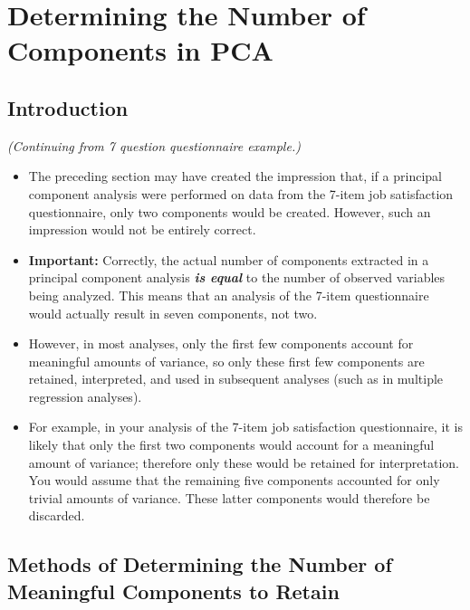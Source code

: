 \documentclass[a4paper,12pt]{article}
\begin{document}
\section{Determining the Number of Components in PCA }
\subsection{Introduction}
\textit{(Continuing from 7 question questionnaire example.)}
\begin{itemize}
	\item The preceding section may have created the impression
	that, if a principal component analysis were performed on data from the 7-item job satisfaction
	questionnaire, only two components would be created.  However, such an impression would not
	be entirely correct.
	
	\item \textbf{Important:} Correctly, the actual number of components extracted in a principal component analysis \textbf{\emph{is equal}} to the
	number of observed variables being analyzed.  This means that an analysis of the 7-item
	questionnaire would actually result in seven components, not two.
	
	\item 	However, in most analyses, only the first few components account for meaningful amounts of
	variance, so only these first few components are retained, interpreted, and used in subsequent
	analyses (such as in multiple regression analyses).  \item For example, in your analysis of the 7-item
	job satisfaction questionnaire, it is likely that only the first two components would account for a
	meaningful amount of variance; therefore only these would be retained for interpretation.
	 You
	would assume that the remaining five components accounted for only trivial amounts of
	variance.  These latter components would therefore be discarded.
\end{itemize}

\subsection{Methods of Determining the Number of Meaningful Components to Retain}
\end{document}
